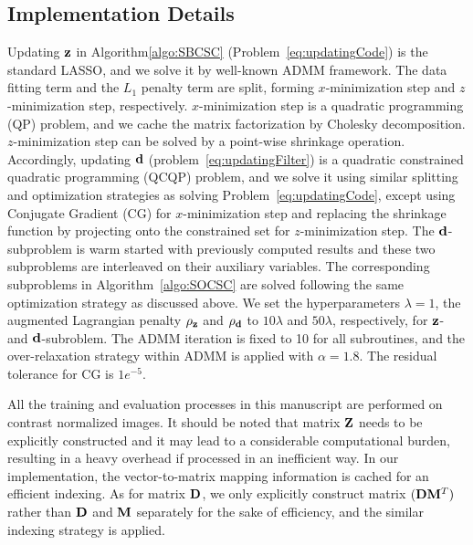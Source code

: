 \subsection{Implementation Details}
Updating $\code$ in Algorithm\ref{algo:SBCSC} (Problem~\ref{eq:updatingCode}) is the standard LASSO, and we solve it by well-known ADMM framework. The data fitting term and the $L_1$ penalty term are split, forming $x$-minimization step and $z$-minimization step, respectively. $x$-minimization step is a quadratic programming (QP) problem, and we cache the matrix factorization by Cholesky decomposition. $z$-minimization step can be solved by a point-wise shrinkage operation. Accordingly, updating $\filter$ (problem~\ref{eq:updatingFilter}) is a quadratic constrained quadratic programming (QCQP) problem, and we solve it using similar splitting and optimization strategies as solving Problem~\ref{eq:updatingCode}, except using Conjugate Gradient (CG) for $x$-minimization step and replacing the shrinkage function by projecting onto the constrained set for $z$-minimization step. The $\filter$-subproblem is warm started with previously computed results and these two subproblems are interleaved on their auxiliary variables. The corresponding subproblems in Algorithm~\ref{algo:SOCSC} are solved following the same optimization strategy as discussed above. We set the hyperparameters $\lambda=1$,  the augmented Lagrangian penalty $\rho_{\code}$ and $\rho_{\filter}$ to $10 \lambda$ and $50 \lambda$, respectively, for $\code$- and $\filter$-subroblem. The ADMM iteration is fixed to 10 for all subroutines, and the over-relaxation strategy within ADMM is applied with $\alpha = 1.8$. The residual tolerance for CG is $1e^{-5}$.

All the training and evaluation processes in this manuscript are performed on contrast normalized images. %
It should be noted that matrix $\Code$ needs to be explicitly constructed and it may lead to a considerable computational burden, resulting in a heavy overhead if processed in an inefficient way. In our implementation, the vector-to-matrix mapping information is cached for an efficient indexing. As for matrix $\Filter$, we only explicitly construct matrix $(\Filter \mask^T)$ rather than $\Filter$ and $\mask$ separately for the sake of efficiency, and the similar indexing strategy is applied.